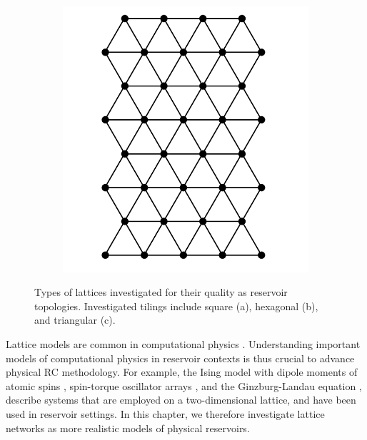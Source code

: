 \begin{figure}[t]
\begin{subfigure}{.32\textwidth}
    \label{fig:rt-hex}
  \end{subfigure}
  \begin{subfigure}{.32\textwidth}
    \centering
    \includegraphics[width=1.0\linewidth]{figures/triangular.png}
    \label{fig:rt-tri}
  \end{subfigure}
  \caption{
    Types of lattices investigated for their quality as reservoir
topologies. Investigated tilings include square (a), hexagonal (b), and
triangular (c).
  }
  \label{fig:regular-tilings}
\end{figure}

Lattice models are common in computational physics
\cite{lavis_equilibrium_2015}. Understanding important models of computational
physics in reservoir contexts is thus crucial to advance physical RC
methodology. For example, the Ising model with dipole moments of atomic spins
\cite{jensen_computation_2018}, spin-torque oscillator arrays
\cite{tsunegi_physical_2019}, and the Ginzburg-Landau equation
\cite{opala_neuromorphic_2019}, describe systems that are employed on a
two-dimensional lattice, and have been used in reservoir settings. In this
chapter, we therefore investigate lattice networks as more realistic models of
physical reservoirs.


